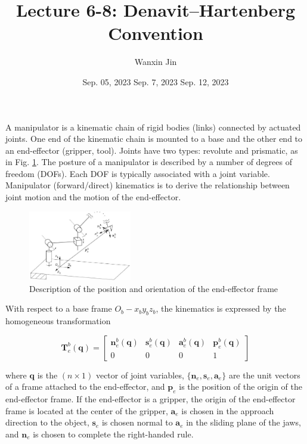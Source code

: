 \documentclass[10pt]{article}
\begin{document}
\title{Lecture 6-8:  Denavit–Hartenberg Convention}
\date{Sep. 05, 2023 \quad Sep. 7, 2023 \quad Sep. 12, 2023 }
\author{Wanxin Jin}
\maketitle



A manipulator is a kinematic chain of rigid bodies (links) connected by actuated joints. One end of the kinematic chain is mounted to a base and the other end to an end-effector (gripper, tool). Joints have two types: revolute and prismatic, as  in Fig. \ref{c1.fig.joints-types}.  
The posture of a manipulator is described by a number of degrees of freedom (DOFs). Each DOF is typically associated with a joint variable. Manipulator (forward/direct) kinematics is to derive the relationship between joint motion and the motion of the end-effector.













\begin{figure}[h]
    \centering
   \includegraphics[max width=0.4\textwidth]{./kinematics/end-effector_frame}
    \caption{Description of the position and orientation of the end-effector frame}
    \label{c1.fig.joints-types}
\end{figure}

With respect to a base frame $O_{b}-x_{b} y_{b} z_{b}$, the  kinematics  is expressed by the homogeneous transformation 

$$
\boldsymbol{T}_{e}^{b}(\boldsymbol{q})=\left[\begin{array}{cccc}
\boldsymbol{n}_{e}^{b}(\boldsymbol{q}) & \boldsymbol{s}_{e}^{b}(\boldsymbol{q}) & \boldsymbol{a}_{e}^{b}(\boldsymbol{q}) & \boldsymbol{p}_{e}^{b}(\boldsymbol{q}) \\
0 & 0 & 0 & 1
\end{array}\right]
$$

where $\boldsymbol{q}$ is the $(n \times 1)$ vector of joint variables, $\{\boldsymbol{n}_{e}, \boldsymbol{s}_{e}, \boldsymbol{a}_{e}\}$ are the unit vectors of a frame attached to the end-effector, and $\boldsymbol{p}_{e}$ is the position  of the origin of the end-effector frame.  If the end-effector is a gripper, the origin of the end-effector frame is located at the center of the gripper,  $\boldsymbol{a}_{e}$ is chosen in the approach direction to the object, $\boldsymbol{s}_{e}$ is chosen normal to $\boldsymbol{a}_{e}$ in the sliding plane of the jaws, and  $\boldsymbol{n}_{e}$ is chosen to complete the right-handed rule.
\end{document}
